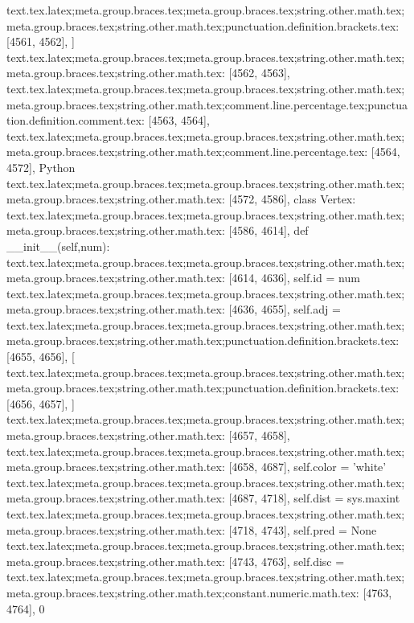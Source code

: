 {{{{{{{{{{{{{{{{{{{{{{{{{{{{{{{{{{{{{{{{{{{{{{{{{{{{{{{{{{{{{{{{{{{{{{{{{{{{{{{{{{{{{{{{{{{{{{{{{{{{{{{{{{{{{{{{{{{{{{{{{{{{{{{{{{{{{{{{{{{{{{{text.tex.latex;meta.group.braces.tex;meta.group.braces.tex;string.other.math.tex;meta.group.braces.tex;string.other.math.tex;punctuation.definition.brackets.tex: [4561, 4562], {]}
text.tex.latex;meta.group.braces.tex;meta.group.braces.tex;string.other.math.tex;meta.group.braces.tex;string.other.math.tex: [4562, 4563], { }
text.tex.latex;meta.group.braces.tex;meta.group.braces.tex;string.other.math.tex;meta.group.braces.tex;string.other.math.tex;comment.line.percentage.tex;punctuation.definition.comment.tex: [4563, 4564], {%
text.tex.latex;meta.group.braces.tex;meta.group.braces.tex;string.other.math.tex;meta.group.braces.tex;string.other.math.tex;comment.line.percentage.tex: [4564, 4572], { Python
}
text.tex.latex;meta.group.braces.tex;meta.group.braces.tex;string.other.math.tex;meta.group.braces.tex;string.other.math.tex: [4572, 4586], {class Vertex:
}
text.tex.latex;meta.group.braces.tex;meta.group.braces.tex;string.other.math.tex;meta.group.braces.tex;string.other.math.tex: [4586, 4614], {    def __init__(self,num):
}
text.tex.latex;meta.group.braces.tex;meta.group.braces.tex;string.other.math.tex;meta.group.braces.tex;string.other.math.tex: [4614, 4636], {        self.id = num
}
text.tex.latex;meta.group.braces.tex;meta.group.braces.tex;string.other.math.tex;meta.group.braces.tex;string.other.math.tex: [4636, 4655], {        self.adj = }
text.tex.latex;meta.group.braces.tex;meta.group.braces.tex;string.other.math.tex;meta.group.braces.tex;string.other.math.tex;punctuation.definition.brackets.tex: [4655, 4656], {[}
text.tex.latex;meta.group.braces.tex;meta.group.braces.tex;string.other.math.tex;meta.group.braces.tex;string.other.math.tex;punctuation.definition.brackets.tex: [4656, 4657], {]}
text.tex.latex;meta.group.braces.tex;meta.group.braces.tex;string.other.math.tex;meta.group.braces.tex;string.other.math.tex: [4657, 4658], {
}
text.tex.latex;meta.group.braces.tex;meta.group.braces.tex;string.other.math.tex;meta.group.braces.tex;string.other.math.tex: [4658, 4687], {        self.color = 'white'
}
text.tex.latex;meta.group.braces.tex;meta.group.braces.tex;string.other.math.tex;meta.group.braces.tex;string.other.math.tex: [4687, 4718], {        self.dist = sys.maxint
}
text.tex.latex;meta.group.braces.tex;meta.group.braces.tex;string.other.math.tex;meta.group.braces.tex;string.other.math.tex: [4718, 4743], {        self.pred = None
}
text.tex.latex;meta.group.braces.tex;meta.group.braces.tex;string.other.math.tex;meta.group.braces.tex;string.other.math.tex: [4743, 4763], {        self.disc = }
text.tex.latex;meta.group.braces.tex;meta.group.braces.tex;string.other.math.tex;meta.group.braces.tex;string.other.math.tex;constant.numeric.math.tex: [4763, 4764], {0}
}}}}}}}}}}}}}}}}}}}}}}}}}}}}}}}}}}}}}}}}}}}}}}}}}}}}}}}}}}}}}}}}}}}}}}}}}}}}}}}}}}}}}}}}}}}}}}}}}}}}}}}}}}}}}}}}}}}}}}}}}}}}}}}}}}}}}}}}}}}}}}}}
